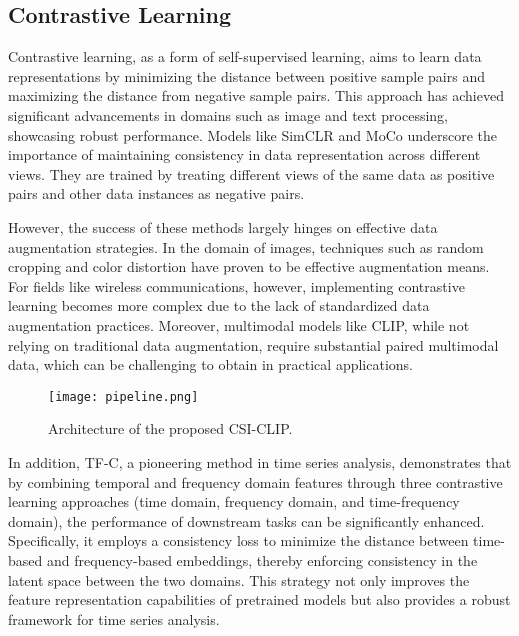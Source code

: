 \subsection{Contrastive Learning}
Contrastive learning, as a form of self-supervised learning, aims to learn data representations by minimizing the distance between positive sample pairs and maximizing the distance from negative sample pairs. This approach has achieved significant advancements in domains such as image and text processing, showcasing robust performance. Models like SimCLR\cite{simclr} and MoCo\cite{moco} underscore the importance of maintaining consistency in data representation across different views. They are trained by treating different views of the same data as positive pairs and other data instances as negative pairs.

However, the success of these methods largely hinges on effective data augmentation strategies. In the domain of images, techniques such as random cropping and color distortion have proven to be effective augmentation means. For fields like wireless communications, however, implementing contrastive learning becomes more complex due to the lack of standardized data augmentation practices. Moreover, multimodal models like CLIP\cite{clip}, while not relying on traditional data augmentation, require substantial paired multimodal data, which can be challenging to obtain in practical applications.

\begin{figure*}[tbp]
\centering\texttt{[image: pipeline.png]}
\caption{Architecture of the proposed CSI-CLIP.}
\label{fig:pipeline}
\end{figure*}

In addition, TF-C\cite{tf-c}, a pioneering method in time series analysis, demonstrates that by combining temporal and frequency domain features through three contrastive learning approaches (time domain, frequency domain, and time-frequency domain), the performance of downstream tasks can be significantly enhanced. Specifically, it employs a consistency loss to minimize the distance between time-based and frequency-based embeddings, thereby enforcing consistency in the latent space between the two domains. This strategy not only improves the feature representation capabilities of pretrained models but also provides a robust framework for time series analysis.